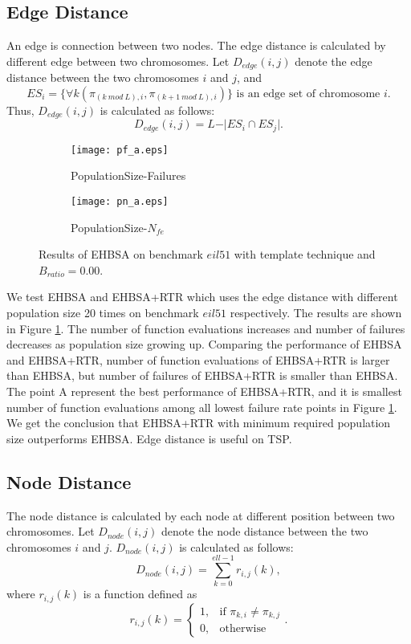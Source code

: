 \subsection{Edge Distance}


An edge is connection between two nodes. The edge distance is calculated by different edge between two chromosomes. Let $D_{edge} (i,j)$ denote the edge distance between the two chromosomes $i$ and $j$, and \[ES_i=\lbrace\forall k(\pi_{(k\ mod\ L),i}, \pi_{(k+1\ mod\ L),i})\rbrace\mbox{ is an edge set of chromosome }i.\] Thus, $D_{edge} (i,j)$ is calculated as follows:\[D_{edge} (i,j)=L-\vert ES_i\cap ES_j\vert.\]

\begin{figure}[htbp] 
        \centering
        \begin{subfigure}{0.49\textwidth}
            \texttt{[image: pf\_a.eps]}
            \caption{PopulationSize-Failures} 
        \end{subfigure}
        \begin{subfigure}{0.49\textwidth} 
            \texttt{[image: pn\_a.eps]}
            \caption{PopulationSize-$N_{fe}$}
        \end{subfigure}

        \caption{Results of EHBSA on benchmark $eil51$ with template technique and $B_{ratio}=0.00$.  } 
        \label{fig:ehbsa_pf}
\end{figure}

We test EHBSA and EHBSA+RTR which uses the edge distance with different population size 20 times on benchmark $eil51$ respectively. The results are shown in Figure \ref{fig:ehbsa_pf}. The number of function evaluations increases and number of failures decreases as population size growing up. Comparing the performance of EHBSA and EHBSA+RTR, number of function evaluations of EHBSA+RTR is larger than EHBSA, but number of failures of EHBSA+RTR is smaller than EHBSA. The point A represent the best performance of EHBSA+RTR, and it is smallest number of function evaluations among all lowest failure rate points in Figure \ref{fig:ehbsa_pf}. We get the conclusion that EHBSA+RTR with minimum required population size outperforms EHBSA. Edge distance is useful on TSP.

\subsection{Node Distance}
The node distance is calculated by each node at different position between two chromosomes. Let $D_{node} (i,j)$ denote the node distance between the two chromosomes $i$ and $j$. $D_{node} (i,j)$ is calculated as follows:\[D_{node} (i,j)=\sum_{k=0}^{ell-1} r_{i,j} (k), \]
where $r_{i,j} (k)$ is a function defined as \[r_{i,j} (k)=
\begin{cases}
1,  & \mbox{if }\pi_{k,i}\neq \pi_{k,j} \\
0, & \mbox{otherwise}
\end{cases}
.\]


